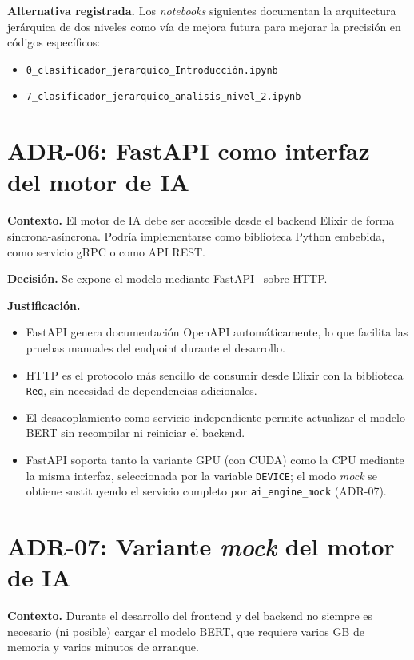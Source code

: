 \textbf{Alternativa registrada.} Los \emph{notebooks} siguientes documentan la arquitectura jerárquica de dos niveles como vía de mejora futura para mejorar la precisión en códigos específicos:
\begin{itemize}
 \item \texttt{0\_\allowbreak{}clasificador\_\allowbreak{}jerarquico\_\allowbreak{}Introducción.ipynb}
 \item \texttt{7\_\allowbreak{}clasificador\_\allowbreak{}jerarquico\_\allowbreak{}analisis\_nivel\_2.ipynb}
\end{itemize}

\section{ADR-06: FastAPI como interfaz del motor de IA}

\textbf{Contexto.} El motor de IA debe ser accesible desde el backend Elixir de forma síncrona-asíncrona. Podría implementarse como biblioteca Python embebida, como servicio gRPC o como API REST.

\textbf{Decisión.} Se expone el modelo mediante FastAPI~\cite{fastapi2024} sobre HTTP.

\textbf{Justificación.}
\begin{itemize}
    \item FastAPI genera documentación OpenAPI automáticamente, lo que facilita las pruebas manuales del endpoint durante el desarrollo.
    \item HTTP es el protocolo más sencillo de consumir desde Elixir con la biblioteca \texttt{Req}, sin necesidad de dependencias adicionales.
    \item El desacoplamiento como servicio independiente permite actualizar el modelo BERT sin recompilar ni reiniciar el backend.
    \item FastAPI soporta tanto la variante GPU (con CUDA) como la CPU mediante la misma interfaz, seleccionada por la variable \texttt{DEVICE}; el modo \emph{mock} se obtiene sustituyendo el servicio completo por \texttt{ai\_engine\_mock} (ADR-07).
\end{itemize}

\section{ADR-07: Variante \emph{mock} del motor de IA}

\textbf{Contexto.} Durante el desarrollo del frontend y del backend no siempre es necesario (ni posible) cargar el modelo BERT, que requiere varios GB de memoria y varios minutos de arranque.

